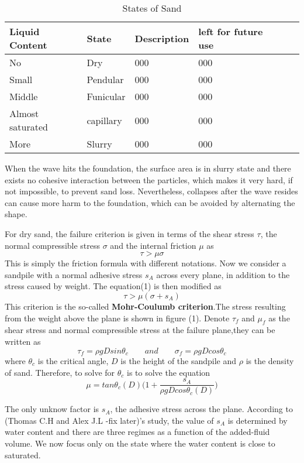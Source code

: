 \documentclass[12pt]{article}
\begin{document}
\begin{table}[H]
	\caption{States of Sand}
	\vspace{10pt}
	\centering
	\begin{tabular}{p{2cm}p{3cm}p{2.5cm}p{2.5cm}p{2.5cm}p{2.5cm}}
		\hline
		Liquid Content & State & Description & left for future use \\
		\hline
		No  			  & Dry   	    & 000          & 000                    \\
		Small  			  & Pendular    & 000     	   & 000                        \\
		Middle  		  & Funicular   & 000    	   & 000                        \\
		Almost saturated  & capillary & 000          & 000                        \\
		More  			  & Slurry      & 000          & 000                        \\  
		\hline       
	\end{tabular}
	\label{bs2}
\end{table}
\par
When the wave hits the foundation, the surface area is in slurry state and there exists no cohesive interaction between the particles, which makes it very hard, if not impossible, to prevent sand loss. Nevertheless, collapses after the wave resides can cause more harm to the foundation, which can be avoided by alternating the shape.
\par 
For dry sand, the failure criterion is given in terms of the shear stress $\tau$, the normal compressible stress $\sigma$ and the internal friction $\mu$ as
$$\tau > \mu\sigma$$
This is simply the friction formula with different notations. Now we consider a sandpile with a normal adhesive stress $s_A$ across every plane, in addition to the stress caused by weight. The equation(1) is then modified as
$$\tau > \mu(\sigma + s_A)$$
This criterion is the so-called \textbf{Mohr-Coulumb criterion}.The stress resulting from the weight above the plane is shown in figure (1). Denote $\tau_f$ and $\mu_f$ as the shear stress and normal compressible stress at the failure plane,they can be written as
$$\tau_f = \rho gDsin\theta_c \qquad and \qquad \sigma_f = \rho gDcos\theta_c$$
where $\theta_c$ is the critical angle, $D$ is the height of the sandpile and $\rho$ is the density of sand. Therefore, to solve for $\theta_c$ is to solve the equation
$$\mu = tan\theta_c(D)\bigg(1 + \frac{s_A}{\rho gDcos\theta_c(D)}\bigg)$$
\par
The only unknow factor is $s_A$, the adhesive stress across the plane. According to (Thomas C.H and Alex J.L -fix later)'s study, the value of $s_A$ is determined by water content and there are three regimes as a function of the added-fluid volume. We now focus only on the state where the water content is close to saturated. 
\end{document}
